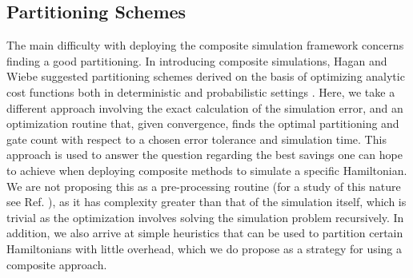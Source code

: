 \subsection{Partitioning Schemes} \label{sec:partition_scheme}
The main difficulty with deploying the composite simulation framework concerns  finding a good partitioning. In introducing composite simulations, Hagan and Wiebe suggested partitioning schemes derived on the basis of optimizing analytic cost functions both in deterministic and probabilistic settings \cite{hagan2022composite}. Here, we take a different approach involving the exact calculation of the simulation error, and an optimization routine that, given convergence, finds the optimal partitioning and gate count with respect to a chosen error tolerance and simulation time. This approach is used to answer the question regarding the best savings one can hope to achieve when deploying composite methods to simulate a specific Hamiltonian. We are not proposing this as a pre-processing routine (for a study of this nature see Ref. \cite{mc2023classically}), as it has complexity greater than that of the simulation itself, which is trivial as the optimization involves solving the simulation problem recursively. In addition, we also arrive at simple heuristics that can be used to partition certain Hamiltonians with little overhead, which we do propose as a strategy for using a composite approach. \\

